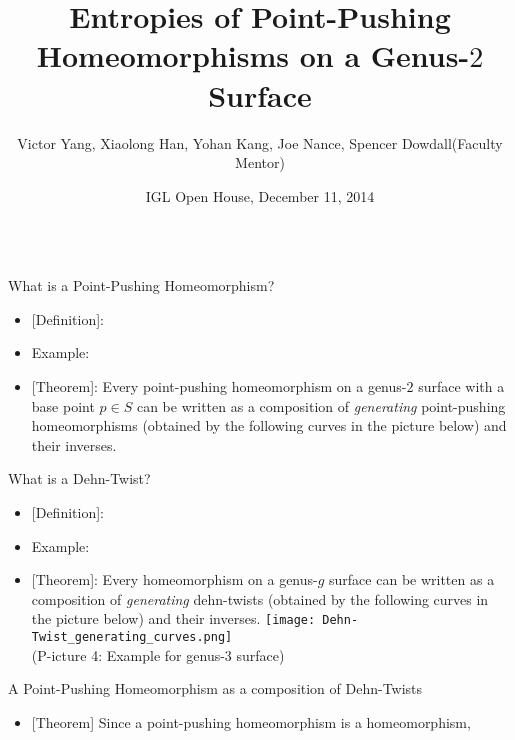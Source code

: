 \documentclass[leqno,presentation]{beamer}
\title{
\veryHuge
Entropies of Point-Pushing Homeomorphisms on a Genus-$2$ Surface}
\author{
  \LARGE
  Victor Yang,
  Xiaolong Han,
  Yohan Kang,
  Joe Nance,
  Spencer Dowdall(Faculty Mentor)}
\institute{
\raisebox{-2ex}{\texttt{[image: uiuc\_logo.pdf]}}
\hspace{4em}
\raisebox{-2ex}{\texttt{[image: igl-logo-small.png]}}
\hspace{1em} 
{\Large\textcolor{red!50!orange}{ Illinois Geometry Lab}}
}
\date{\large IGL Open House, December 11, 2014}
\begin{document}
\begin{frame}

\begin{block}{}
\titlepage
\end{block}

\begin{columns}[t]

\begin{column}[t]{.25\linewidth}

\begin{block}{What is a Point-Pushing Homeomorphism?}
\vspace{1ex}
\begin{itemize}
\item {[Definition]}:
\item Example:
\item {[Theorem]}: Every point-pushing homeomorphism on a genus-$2$ surface with a base point $p\in S$ can be written as a composition of \textit{generating} point-pushing homeomorphisms (obtained by the following curves in the picture below) and their inverses.
\end{itemize}
\end{block}

\begin{block}{What is a Dehn-Twist?}
\vspace{1ex}
\begin{itemize}
\item {[Definition]}: 
\item Example:
\item {[Theorem]}: Every homeomorphism on a genus-$g$ surface can be written as a composition of \textit{generating} dehn-twists (obtained by the following curves in the picture below) and their inverses.
\texttt{[image: Dehn-Twist\_generating\_curves.png]}\\
(P-icture 4: Example for genus-$3$ surface)
\end{itemize}
\end{block}

\begin{block}{A Point-Pushing Homeomorphism as a composition of Dehn-Twists}
\vspace{1ex}
\begin{itemize}
\item {[Theorem]} Since a point-pushing homeomorphism is a homeomorphism, 
\end{itemize}
\end{block}

\end{column}


\end{columns}
\end{frame}
\end{document}
